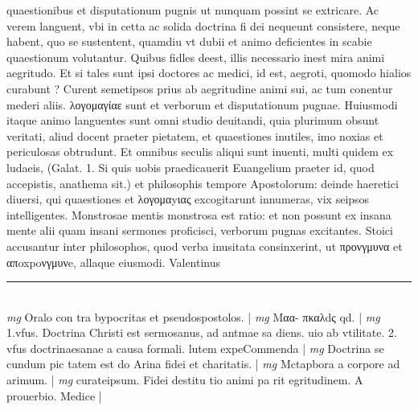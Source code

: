 \documentclass{article}
\begin{document}
\begin{pages}
quaestionibus et disputationum pugnis ut nunquam possint se extricare. Ac verem languent, vbi in cetta ac solida doctrina fi dei nequeunt consistere, neque habent, quo se sustentent, quamdiu vt dubii et animo deficientes in scabie quaestionum volutantur. Quibus fidles deest, illis necessario inest mira animi aegritudo. Et si tales sunt ipsi doctores ac medici, id est, aegroti, quomodo hialios curabunt ? Curent semetipsos prius ab aegritudine animi sui, ac tum conentur mederi aliis. λογομαγίαε sunt et verborum et disputationum pugnae. Huiusmodi itaque animo languentes sunt omni studio deuitandi, quia plurimum obsunt veritati, aliud docent praeter pietatem, et quaestiones inutiles, imo noxias et periculosas obtrudunt. Et omnibus seculis aliqui sunt inuenti, multi quidem ex ludaeis, (Galat. 1. Si quis uobis praedicauerit Euangelium praeter id, quod accepistis, anathema sit.) et philosophis tempore Apostolorum: deinde haeretici diuersi, qui quaestiones et λογομαyιας excogitarunt innumeras, vix seipsos intelligentes. Monstrosae mentis monstrosa est ratio: et non possunt ex insana mente alii quam insani sermones proficisci, verborum pugnas excitantes. Stoici accusantur inter philosophos, quod verba inusitata consinxerint, ut προνγμυνα et απoxpoνγμυνe, allaque eiusmodi. Valentinus  \pend
\vspace{0.5cm}\noindent
\vspace{0.2cm}\rule{1cm}{0.2pt}\\ 
\hspace{0.2cm}\textit{mg}
\footnotesize Oralo con tra bypocritas et pseudospostolos. 
\normalsize| 
\hspace{0.2cm}\textit{mg}
\footnotesize Mαα- πκαλdς qd. 
\normalsize| 
\hspace{0.2cm}\textit{mg}
\footnotesize 1.vfus. Doctrina Christi est sermosanus, ad antmae sa diens. uio ab vtilitate. 2. vfus doctrinaesanae a causa formali. lutem expeCommenda 
\normalsize| 
\hspace{0.2cm}\textit{mg}
\footnotesize Doctrina se cundum pic tatem est do Arina fidei et charitatis. 
\normalsize| 
\hspace{0.2cm}\textit{mg}
\footnotesize Mctapbora a corpore ad arimum. 
\normalsize| 
\hspace{0.2cm}\textit{mg}
\footnotesize curateipsum. Fidei destitu tio animi pa rit egritudinem. A prouerbio. Medice    
\normalsize| 

\end{pages}
\end{document}
